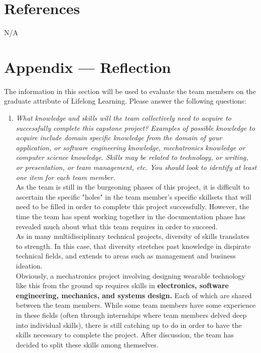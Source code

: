 \documentclass[12pt]{article}
\begin{document}
\section{References}
N/A

\section*{Appendix --- Reflection}

The information in this section will be used to evaluate the team members on the
graduate attribute of Lifelong Learning.  Please answer the following questions:

\begin{enumerate}
  \item \textit{What knowledge and skills will the team collectively need to acquire to
        successfully complete this capstone project?  Examples of possible knowledge
        to acquire include domain specific knowledge from the domain of your
        application, or software engineering knowledge, mechatronics knowledge or
        computer science knowledge.  Skills may be related to technology, or writing,
        or presentation, or team management, etc.  You should look to identify at
        least one item for each team member.}\\

	As the team is still in the burgeoning phases of this project, it is difficult to ascertain the specific "holes" in the team member's specific skillsets that will need to be filled in order to complete this project successfully. However, the time the team has spent working together in the documentation phase has revealed much about what this team requires in order to succeed. \\

As in many multidisciplinary technical projects, diversity of skills translates to strength. In this case, that diversity stretches past knowledge in dispirate technical fields, and extends to areas such as management and business ideation.\\

Obviously, a mechatronics project involving designing wearable technology like this from the ground up requires skills in \textbf{electronics, software engineering, mechanics, and systems design.} Each of which are shared between the team members. While some team members have some experience in these fields (often through internships where team members delved deep into individual skills), there is still catching up to do in order to have the skills necessary to complete the project. After discussion, the team has decided to split these skills among themselves.\\


\end{enumerate}
\end{document}
